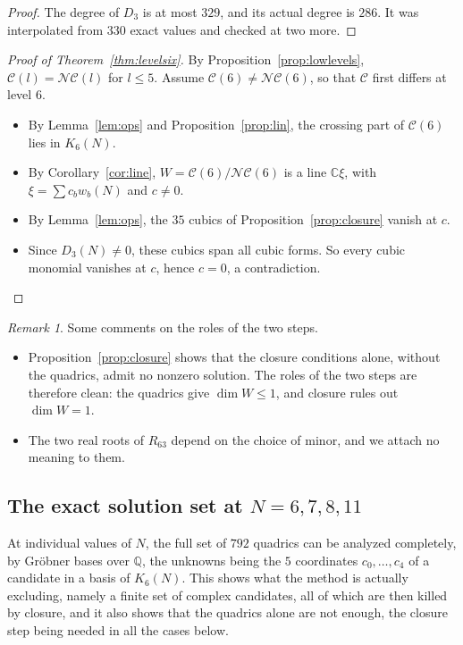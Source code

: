 \documentclass[11pt]{amsart}
\theoremstyle{definition}
\theoremstyle{remark}
\newtheorem{remark}[theorem]{Remark}
\theoremstyle{plain}
\numberwithin{equation}{section}
\numberwithin{table}{section}
\newcommand{\C}{\mathbb C}
\newcommand{\Q}{\mathbb Q}
\newcommand{\NC}{\mathcal{NC}}
\begin{document}
\begin{proof}
The degree of $D_3$ is at most $329$, and its actual degree is $286$. It was interpolated from $330$ exact values and checked at two more.
\end{proof}

\begin{proof}[Proof of Theorem~\ref{thm:levelsix}]
By Proposition~\ref{prop:lowlevels}, $\mathcal C(l)=\NC(l)$ for $l\le5$. Assume $\mathcal C(6)\ne\NC(6)$, so that $\mathcal C$ first differs at level $6$.
\begin{itemize}
\item By Lemma~\ref{lem:ops} and Proposition~\ref{prop:lin}, the crossing part of $\mathcal C(6)$ lies in $K_6(N)$.
\item By Corollary~\ref{cor:line}, $W=\mathcal C(6)/\NC(6)$ is a line $\C\xi$, with $\xi=\sum c_bw_b(N)$ and $c\ne0$.
\item By Lemma~\ref{lem:ops}, the $35$ cubics of Proposition~\ref{prop:closure} vanish at $c$.
\item Since $D_3(N)\ne0$, these cubics span all cubic forms. So every cubic monomial vanishes at $c$, hence $c=0$, a contradiction. \qedhere
\end{itemize}
\end{proof}

\begin{remark}
Some comments on the roles of the two steps.
\begin{itemize}
\item Proposition~\ref{prop:closure} shows that the closure conditions alone, without the quadrics, admit no nonzero solution. The roles of the two steps are therefore clean: the quadrics give $\dim W\le1$, and closure rules out $\dim W=1$.
\item The two real roots of $R_{63}$ depend on the choice of minor, and we attach no meaning to them.
\end{itemize}
\end{remark}

\subsection{The exact solution set at $N=6,7,8,11$}

At individual values of $N$, the full set of $792$ quadrics can be analyzed completely, by Gr\"obner bases over $\Q$, the unknowns being the $5$ coordinates $c_0,\dots,c_4$ of a candidate in a basis of $K_6(N)$. This shows what the method is actually excluding, namely a finite set of complex candidates, all of which are then killed by closure, and it also shows that the quadrics alone are not enough, the closure step being needed in all the cases below.
\end{document}
